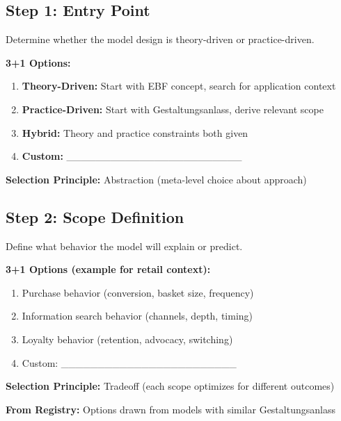 \subsection{Step 1: Entry Point}

Determine whether the model design is theory-driven or practice-driven.

\begin{tcolorbox}[colback=white, colframe=black,
    title=Step 1: Entry Point Selection]
\textbf{3+1 Options:}
\begin{enumerate}
\item[$\square$] \textbf{Theory-Driven:} Start with EBF concept, search for application context
\item[$\square$] \textbf{Practice-Driven:} Start with Gestaltungsanlass, derive relevant scope
\item[$\square$] \textbf{Hybrid:} Theory and practice constraints both given
\item[$\square$] \textbf{Custom:} \_\_\_\_\_\_\_\_\_\_\_\_\_\_\_\_\_\_\_\_\_\_\_\_
\end{enumerate}

\textbf{Selection Principle:} Abstraction (meta-level choice about approach)
\end{tcolorbox}

\subsection{Step 2: Scope Definition}

Define what behavior the model will explain or predict.

\begin{tcolorbox}[colback=white, colframe=black,
    title=Step 2: Scope Definition]
\textbf{3+1 Options (example for retail context):}
\begin{enumerate}
\item[$\square$] Purchase behavior (conversion, basket size, frequency)
\item[$\square$] Information search behavior (channels, depth, timing)
\item[$\square$] Loyalty behavior (retention, advocacy, switching)
\item[$\square$] Custom: \_\_\_\_\_\_\_\_\_\_\_\_\_\_\_\_\_\_\_\_\_\_\_\_
\end{enumerate}

\textbf{Selection Principle:} Tradeoff (each scope optimizes for different outcomes)

\textbf{From Registry:} Options drawn from models with similar Gestaltungsanlass
\end{tcolorbox}

